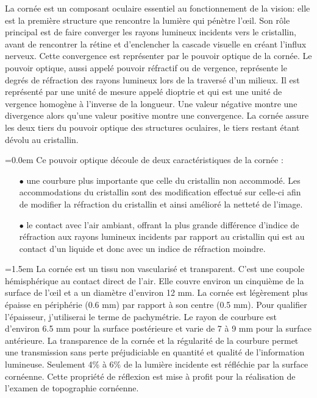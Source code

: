 \documentclass[a4paper,12pt]{article}
\begin{document}
La cornée est un composant oculaire essentiel au fonctionnement de la vision: elle est la première structure que rencontre la lumière qui pénètre l’œil. Son rôle principal est de faire converger les rayons lumineux incidents vers le cristallin, avant de rencontrer la rétine et d'enclencher la cascade visuelle en créant l'influx nerveux. Cette convergence est représenter par le pouvoir optique de la cornée. Le pouvoir optique, aussi appelé pouvoir réfractif ou de vergence, représente le degrés de réfraction des rayons lumineux lors de la traversé d'un milieux. Il est représenté par une unité de mesure appelé dioptrie et qui est une unité de vergence homogène à l'inverse de la longueur.  Une valeur négative montre une divergence alors qu'une valeur positive montre une convergence. La cornée assure les deux tiers du pouvoir optique des structures oculaires, le tiers restant étant dévolu au cristallin.

\parindent=0.0em
 Ce pouvoir optique découle de deux caractéristiques de la cornée : \vspace{0.15cm}
\begin{itemize}\setlength{\itemsep}{1mm}
	\item[$\bullet$] une courbure plus importante que celle du cristallin non accommodé. Les accommodations du cristallin sont des modification effectué sur celle-ci afin de modifier la réfraction du cristallin et ainsi amélioré la netteté de l'image.
	\item[$\bullet$] le contact avec l'air ambiant, offrant la plus grande différence d'indice de réfraction aux rayons lumineux incidents par rapport au cristallin qui est au contact d'un liquide et donc avec un indice de réfraction moindre. 
\end{itemize}

\parindent=1.5em
 \vspace{0.5cm}
La cornée est un tissu non vascularisé et transparent. C'est une coupole hémisphérique au contact direct de l'air. Elle couvre environ un cinquième de la surface de l’œil et a un diamètre d'environ 12 mm. La cornée est légèrement plus épaisse en périphérie (0.6 mm) par rapport à son centre (0.5 mm). Pour qualifier l'épaisseur, j'utiliserai le terme de pachymétrie. Le rayon de courbure est d'environ 6.5 mm pour la surface postérieure et varie de 7 à 9 mm pour la surface antérieure. La transparence de la cornée et la régularité de la courbure permet une transmission sans perte préjudiciable en quantité et qualité de l'information lumineuse. Seulement 4\% à 6\% de la lumière incidente est réfléchie par la surface cornéenne. Cette propriété de réflexion est mise à profit pour la réalisation de l'examen de topographie cornéenne. \cite{gatinel}
\end{document}
